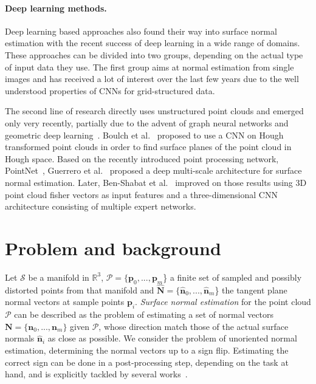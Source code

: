 \documentclass[10pt,twocolumn,letterpaper]{article}
\begin{document}
\paragraph{Deep learning methods.} Deep learning based approaches also found their
way into surface normal estimation with the recent success of deep learning in a wide
range of domains. These approaches can be divided into two groups, depending on
the actual type of input data they use. The first group aims at normal estimation 
from single images \cite{Bansal:2016, Eigen:2015, Fouhey:2013, Ladicky:2014, Li:2015, Qi:2018, Wang:2015} and has received a lot of interest over the last few years due to the well understood properties of CNNs for grid-structured data.


The second line of research
directly uses unstructured point clouds and emerged only 
very recently, partially due to the advent of graph neural networks
and geometric deep learning~\cite{BronsteinGDLSurvey:2017}.
Boulch et al.~\cite{Boulch:2016} proposed to use a CNN on
Hough transformed point clouds in order to find surface planes of the
point cloud in Hough space. 
Based on the recently introduced point processing network, 
PointNet~\cite{Qi:2017}, Guerrero et al.~\cite{Guerrero:2018} proposed a 
deep multi-scale architecture for surface normal estimation. 
Later, Ben-Shabat et al.~\cite{Ben-Shabat:2018} improved on those results
using 3D point cloud fisher vectors as input features and a three-dimensional CNN
architecture consisting of multiple expert networks.







\section{Problem and background}
Let $\mathcal{S}$ be a manifold in $\mathbb{R}^3$, $\mathcal{P} = \{\mathbf{p}_0, ..., \mathbf{p}_m$\} a finite set of sampled and possibly distorted points from that manifold and $\hat{\mathbf{N}} = \{\hat{\mathbf{n}}_0, ..., \hat{\mathbf{n}}_m$\} the tangent plane normal vectors at sample points $\mathbf{p}_i$. \emph{Surface normal estimation} for the point cloud $\mathcal{P}$ can be described as the problem of estimating a set of normal vectors $\mathbf{N} = \{\mathbf{n}_0, ..., \mathbf{n}_m\}$ given $\mathcal{P}$, whose direction match those of the actual surface normals $\hat{\mathbf{n}}_i$ as close as possible. We consider the problem of unoriented normal estimation, determining the normal vectors up to a sign flip. Estimating the correct sign can be done in a post-processing step, depending on the task at hand, and is explicitly tackled by several works~\cite{Mullen:2010, Huang:2019, Wu:2015}.
\end{document}

